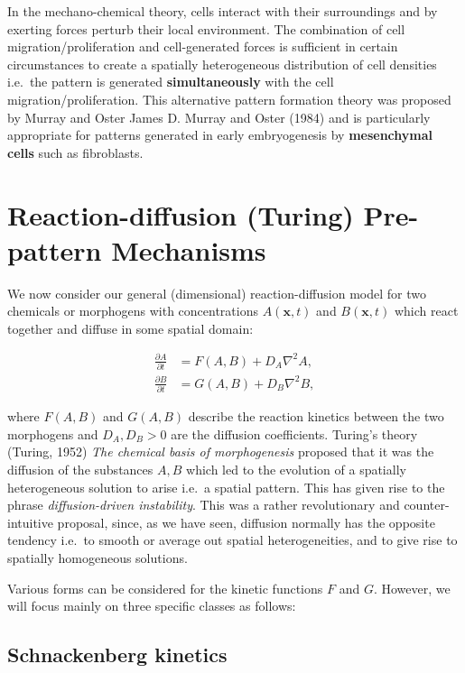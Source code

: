 \documentclass[
  letterpaper,
  DIV=11,
  numbers=noendperiod]{scrreprt}
\theoremstyle{plain}
\theoremstyle{definition}
\theoremstyle{plain}
\theoremstyle{remark}
\begin{document}
In the mechano-chemical theory, cells interact with their surroundings
and by exerting forces perturb their local environment. The combination
of cell migration/proliferation and cell-generated forces is sufficient
in certain circumstances to create a spatially heterogeneous
distribution of cell densities i.e.~the pattern is generated
\textbf{simultaneously} with the cell migration/proliferation. This
alternative pattern formation theory was proposed by Murray and Oster
James D. Murray and Oster (1984) and is particularly appropriate for
patterns generated in early embryogenesis by \textbf{mesenchymal cells}
such as fibroblasts.

\hypertarget{reaction-diffusion-turing-pre-pattern-mechanisms}{%
\section{Reaction-diffusion (Turing) Pre-pattern
Mechanisms}\label{reaction-diffusion-turing-pre-pattern-mechanisms}}

We now consider our general (dimensional) reaction-diffusion model for
two chemicals or morphogens with concentrations \(A({\mathbf{x}}, t)\)
and \(B({\mathbf{x}}, t)\) which react together and diffuse in some
spatial domain:

\[
\begin{aligned}
\frac{\partial A}{\partial  t} & =  F(A,B)  + D_A \nabla^2 A, \\
\frac{\partial B}{\partial  t} & =  G(A,B)  + D_B \nabla^2 B,
\end{aligned}
\]

where \(F(A,B)\) and \(G(A,B)\) describe the reaction kinetics between
the two morphogens and \(D_A, D_B > 0\) are the diffusion coefficients.
Turing's theory (Turing, 1952) \emph{The chemical basis of
morphogenesis} proposed that it was the diffusion of the substances
\(A, B\) which led to the evolution of a spatially heterogeneous
solution to arise i.e.~a spatial pattern. This has given rise to the
phrase \emph{diffusion-driven instability}. This was a rather
revolutionary and counter-intuitive proposal, since, as we have seen,
diffusion normally has the opposite tendency i.e.~to smooth or average
out spatial heterogeneities, and to give rise to spatially homogeneous
solutions.

Various forms can be considered for the kinetic functions \(F\) and
\(G\). However, we will focus mainly on three specific classes as
follows:

\hypertarget{schnackenberg-kinetics}{%
\subsection{Schnackenberg kinetics}\label{schnackenberg-kinetics}}
\end{document}
